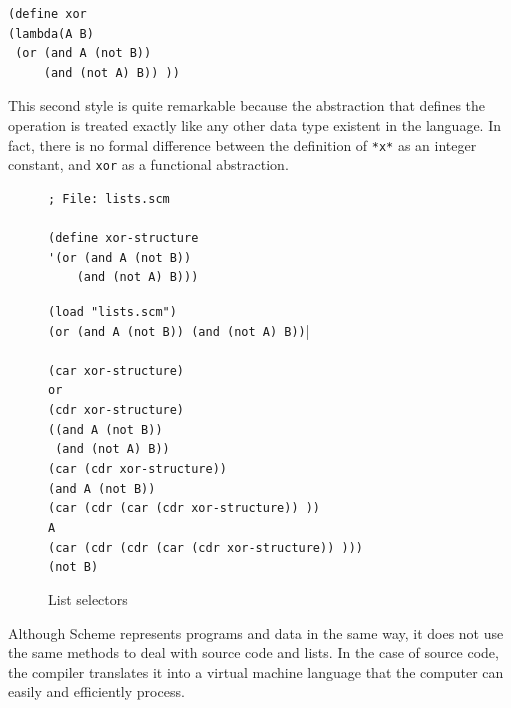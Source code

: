 \documentclass[a4paper,12pt]{book}
\newenvironment{fmpage}[1]
           {\begin{lrbox}{\fmbox}\begin{minipage}{#1}}
           {\end{minipage}\end{lrbox}\fbox{\usebox{\fmbox}}}
\begin{document}
\begin{verbatim}
(define xor
(lambda(A B)
 (or (and A (not B))
     (and (not A) B)) ))
\end{verbatim}

This second style is quite remarkable because
the abstraction that defines the operation
is treated exactly like any other
data type existent in the language.
In fact, there is no formal difference
between the definition of \verb|*x*|
as an integer constant, and \verb|xor|
as a functional abstraction.

\begin{figure}[!h]
\begin{fmpage}{0.8\linewidth}
\begin{verbatim}
; File: lists.scm

(define xor-structure
'(or (and A (not B))
    (and (not A) B)))
\end{verbatim}
\end{fmpage}

\begin{fmpage}{0.8\linewidth}
\verb|(load "lists.scm")|\keys{~]~}\\
\verb|(or (and A (not B)) (and (not A) B))||\\
\verb||\\
\verb|(car xor-structure)| \keys{~]~} \\
\verb|or|\\
\verb|(cdr xor-structure)|\keys{~]~}\\
\verb|((and A (not B))|\\
\verb| (and (not A) B))|\\
\verb|(car (cdr xor-structure))|\keys{~]~}\\
\verb|(and A (not B))|\\
\verb|(car (cdr (car (cdr xor-structure)) ))|\keys{~]~}\\
\verb|A|\\
\verb|(car (cdr (cdr (car (cdr xor-structure)) )))|\keys{~]~}\\
\verb|(not B)|
\end{fmpage}

\begin{fmpage}{0.8\linewidth}
\verb||
\end{fmpage}
\caption{List selectors}
\label{fig:selectors}
\end{figure}


Although Scheme represents programs and
data in the same way, it does not use
the same methods to deal with source
code and lists. In the case of source
code, the compiler translates it into
a virtual machine language that the
computer can easily and efficiently
process.
\end{document}
